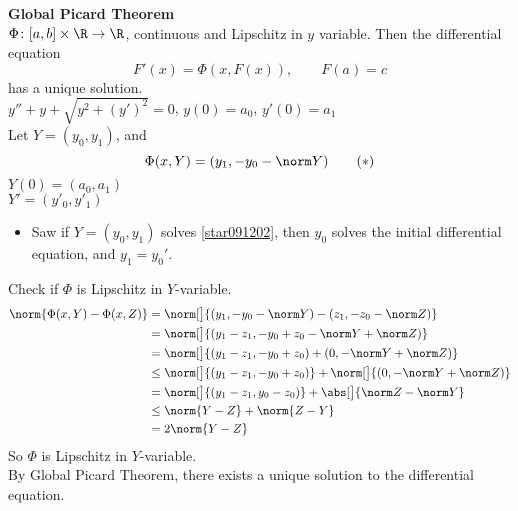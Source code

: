 \textbf{Global Picard Theorem} \\
$\Phi\colon[a,b]\times\R\to\R$, continuous and Lipschitz in $y$ variable.  Then the differential equation %
\[ F'(x) = \Phi(x,F(x)), \qquad F(a)=c \]
has a unique solution. \\
\ex $y''+y+\sqrt{y^2+(y')^2}=0$, $y(0)=a_0$, $y'(0)=a_1$ \\
Let $Y=(y_0,y_1)$, and
\[ \Phi(x,Y)=(y_1,-y_0-\norm Y) \label{star091202}\tag{$*$} \]
$Y(0)=(a_0,a_1)$ \\
$Y'=(y'_0,y'_1)$%
\begin{itemize}
\item Saw if $Y=(y_0,y_1)$ solves \eqref{star091202}, then $y_0$ solves the initial differential equation, and $y_1=y_0'$.
\end{itemize}
Check if $\Phi$ is Lipschitz in $Y$-variable.
\begin{align*}
\norm{\Phi(x,Y)-\Phi(x,Z)} &= \norm[\big]{(y_1,-y_0-\norm Y)-(z_1,-z_0-\norm Z)} \\
&= \norm[\big]{(y_1-z_1,-y_0+z_0-\norm Y+\norm Z)} \\
&= \norm[\big]{(y_1-z_1,-y_0+z_0)+(0,-\norm Y+\norm Z)} \\
&\leq \norm[\big]{(y_1-z_1,-y_0+z_0)} + \norm[\big]{(0,-\norm Y+\norm Z)} \\
&= \norm[\big]{(y_1-z_1,y_0-z_0)} + \abs[\big]{\norm Z-\norm Y} \\
&\leq \norm{Y-Z} + \norm{Z-Y} \\
&= 2\norm{Y-Z}
\end{align*}
So $\Phi$ is Lipschitz in $Y$-variable. \\
By Global Picard Theorem, there exists a unique solution to the differential equation.


